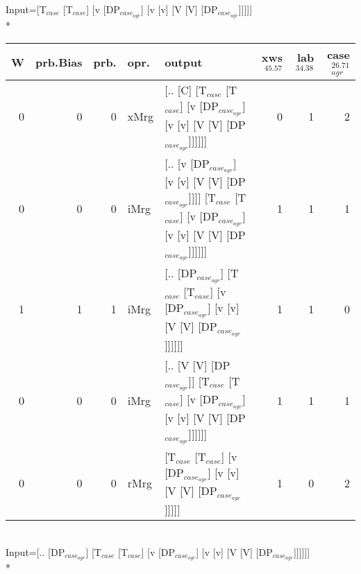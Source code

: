 \begingroup\scriptsize Input=[T$_{case}$ [T$_{case}$] [v [DP$_{case_{agr}}$] [v [v] [V [V] [DP$_{case_{agr}}$]]]]]\\*
\begin{tabularx}{\linewidth}{rrrlXrrr}
\hline
   W &   prb.Bias &   prb. & opr.   & output                                                                                                                 &   xws$^{45.57}$ &   lab$^{34.38}$ &   case$_{agr}^{26.71}$ \\
\hline
   0 &       0 &   0 & xMrg & [.. [C] [T$_{case}$ [T$_{case}$] [v [DP$_{case_{agr}}$] [v [v] [V [V] [DP$_{case_{agr}}$]]]]]]                                             &             0 &             1 &                  2 \\
   0 &       0 &   0 & iMrg & [.. [v [DP$_{case_{agr}}$] [v [v] [V [V] [DP$_{case_{agr}}$]]]] [T$_{case}$ [T$_{case}$] [v [DP$_{case_{agr}}$] [v [v] [V [V] [DP$_{case_{agr}}$]]]]]] &             1 &             1 &                  1 \\
   1 &       1 &   1 & iMrg & [.. [DP$_{case_{agr}}$] [T$_{case}$ [T$_{case}$] [v [DP$_{case_{agr}}$] [v [v] [V [V] [DP$_{case_{agr}}$]]]]]]                                   &             1 &             1 &                  0 \\
   0 &       0 &   0 & iMrg & [.. [V [V] [DP$_{case_{agr}}$]] [T$_{case}$ [T$_{case}$] [v [DP$_{case_{agr}}$] [v [v] [V [V] [DP$_{case_{agr}}$]]]]]]                           &             1 &             1 &                  1 \\
   0 &       0 &   0 & rMrg & [T$_{case}$ [T$_{case}$] [v [DP$_{case_{agr}}$] [v [v] [V [V] [DP$_{case_{agr}}$]]]]]                                                      &             1 &             0 &                  2 \\
\hline
\end{tabularx}\endgroup\\
\begingroup\scriptsize Input=[.. [DP$_{case_{agr}}$] [T$_{case}$ [T$_{case}$] [v [DP$_{case_{agr}}$] [v [v] [V [V] [DP$_{case_{agr}}$]]]]]]\\*
